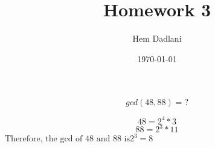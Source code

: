 \documentclass{article}
\title{Homework 3}
\author{Hem Dadlani}
\date{\today}
\begin{document}
\maketitle

\begin{problem}
    $$gcd(48,88) = ?$$
    \begin{solution}
        $$48 = 2^4 * 3$$
        $$88 = 2^3 * 11$$
        $\text{Therefore, the gcd of 48 and 88 is} 2^3 = 8$

    \end{solution}
\end{problem}

\begin{problem}
    
\end{problem}
\end{document}
